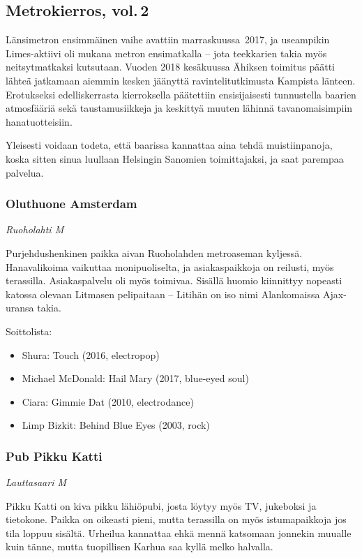 \documentclass[../ala_hataile.tex]{subfiles}
\begin{document}
\subsection*{Metrokierros, vol.\,2}
Länsimetron ensimmäinen vaihe avattiin marraskuussa~2017, ja useampikin Limes-aktiivi oli mukana metron ensimatkalla -- jota teekkarien takia myös neitsyt\-matkaksi kutsutaan. Vuoden 2018 kesäkuussa Ähiksen toimitus päätti lähteä jatkamaan aiemmin kesken jäänyttä ravinteli\-tutkimusta Kampista länteen. Erotukseksi edelliskerrasta kierroksella päätettiin ensisijaisesti tunnustella baarien atmosfääriä sekä taustamusiikkeja ja keskittyä muuten lähinnä tavan\-omaisimpiin hana\-tuotteisiin.

Yleisesti voidaan todeta, että baarissa kannattaa aina tehdä muistiin\-panoja, koska sitten sinua luullaan Helsingin Sanomien toimittajaksi, ja saat parempaa palvelua.
\subsubsection*{Oluthuone Amsterdam}
\textit{Ruoholahti M}

Purjehdus\-henkinen paikka aivan Ruoho\-lahden metro\-aseman kyljessä. Hana\-valikoima vaikuttaa monipuoliselta, ja asiakas\-paikkoja on reilusti, myös terassilla. Asiakas\-palvelu oli myös toimivaa. Sisällä huomio kiinnittyy nopeasti katossa olevaan Litmasen peli\-paitaan -- Litihän on iso nimi Alanko\-maissa Ajax-uransa takia. 

Soittolista:
\begin{itemize}
	\item Shura: Touch (2016, electropop)
	\item Michael McDonald: Hail Mary (2017, blue-eyed soul)
	\item Ciara: Gimmie Dat (2010, electrodance)
	\item Limp Bizkit: Behind Blue Eyes (2003, rock)
\end{itemize}
\subsubsection*{Pub Pikku Katti}
\textit{Lauttasaari M}

Pikku Katti on kiva pikku lähiö\-pubi, josta löytyy myös TV, juke\-boksi ja tieto\-kone. Paikka on oikeasti pieni, mutta terassilla on myös istuma\-paikkoja jos tila loppuu sisältä. Urheilua kannattaa ehkä mennä katsomaan jonnekin muualle kuin tänne, mutta tuopillisen Karhua saa kyllä melko halvalla.
\end{document}
